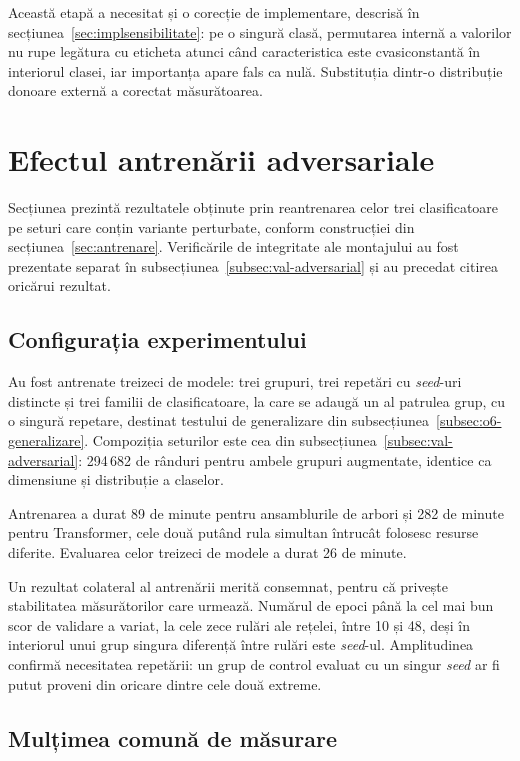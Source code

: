 Această etapă a necesitat și o corecție de implementare, descrisă în secțiunea~\ref{sec:implsensibilitate}: pe o singură clasă, permutarea internă a valorilor nu rupe legătura cu eticheta atunci când caracteristica este cvasiconstantă în interiorul clasei, iar importanța apare fals ca nulă. Substituția dintr-o distribuție donoare externă a corectat măsurătoarea.

\section{Efectul antrenării adversariale}\label{sec:rezultate-o6}

Secțiunea prezintă rezultatele obținute prin reantrenarea celor trei clasificatoare pe seturi care conțin variante perturbate, conform construcției din secțiunea~\ref{sec:antrenare}. Verificările de integritate ale montajului au fost prezentate separat în subsecțiunea~\ref{subsec:val-adversarial} și au precedat citirea oricărui rezultat.

\subsection{Configurația experimentului}\label{subsec:o6-config}

Au fost antrenate treizeci de modele: trei grupuri, trei repetări cu \textit{seed}-uri distincte și trei familii de clasificatoare, la care se adaugă un al patrulea grup, cu o singură repetare, destinat testului de generalizare din subsecțiunea~\ref{subsec:o6-generalizare}. Compoziția seturilor este cea din subsecțiunea~\ref{subsec:val-adversarial}: 294\,682 de rânduri pentru ambele grupuri augmentate, identice ca dimensiune și distribuție a claselor.

Antrenarea a durat 89 de minute pentru ansamblurile de arbori și 282 de minute pentru Transformer, cele două putând rula simultan întrucât folosesc resurse diferite. Evaluarea celor treizeci de modele a durat 26 de minute.

Un rezultat colateral al antrenării merită consemnat, pentru că privește stabilitatea măsurătorilor care urmează. Numărul de epoci până la cel mai bun scor de validare a variat, la cele zece rulări ale rețelei, între 10 și 48, deși în interiorul unui grup singura diferență între rulări este \textit{seed}-ul. Amplitudinea confirmă necesitatea repetării: un grup de control evaluat cu un singur \textit{seed} ar fi putut proveni din oricare dintre cele două extreme.

\subsection{Mulțimea comună de măsurare}\label{subsec:o6-cohorta}

